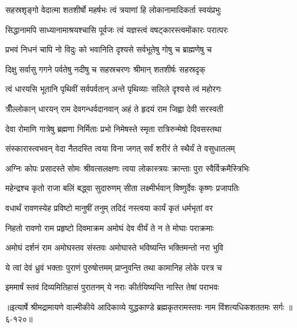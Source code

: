 \twolineshloka
{सहस्रशृङ्गो वेदात्मा शतशीर्षो महर्षभः}
{त्वं त्रयाणां हि लोकानामादिकर्ता स्वयंप्रभुः} %

\twolineshloka
{सिद्धानामपि साध्यानामाश्रयश्चासि पूर्वजः}
{त्वं यज्ञस्त्वं वषट्कारस्त्वमोंकारः परात्परः} %

\twolineshloka
{प्रभवं निधनं चापि नो विदुः को भवानिति}
{दृश्यसे सर्वभूतेषु गोषु च ब्राह्मणेषु च} %

\twolineshloka
{दिक्षु सर्वासु गगने पर्वतेषु नदीषु च}
{सहस्रचरणः श्रीमान् शतशीर्षः सहस्रदृक्} %

\twolineshloka
{त्वं धारयसि भूतानि पृथिवीं सर्वपर्वतान्}
{अन्ते पृथिव्याः सलिले दृश्यसे त्वं महोरगः} %

\twolineshloka
{त्रीँल्लोकान् धारयन् राम देवगन्धर्वदानवान्}
{अहं ते हृदयं राम जिह्वा देवी सरस्वती} %

\twolineshloka
{देवा रोमाणि गात्रेषु ब्रह्मणा निर्मिताः प्रभो}
{निमेषस्ते स्मृता रात्रिरुन्मेषो दिवसस्तथा} %

\twolineshloka
{संस्कारास्त्वभवन् वेदा नैतदस्ति त्वया विना}
{जगत् सर्वं शरीरं ते स्थैर्यं ते वसुधातलम्} %

\twolineshloka
{अग्निः कोपः प्रसादस्ते सोमः श्रीवत्सलक्षणः}
{त्वया लोकास्त्रयः क्रान्ताः पुरा स्वैर्विक्रमैस्त्रिभिः} %

\twolineshloka
{महेन्द्रश्च कृतो राजा बलिं बद्ध्वा सुदारुणम्}
{सीता लक्ष्मीर्भवान् विष्णुर्देवः कृष्णः प्रजापतिः} %

\twolineshloka
{वधार्थं रावणस्येह प्रविष्टो मानुषीं तनुम्}
{तदिदं नस्त्वया कार्यं कृतं धर्मभृतां वर} %

\twolineshloka
{निहतो रावणो राम प्रहृष्टो दिवमाक्रम}
{अमोघं देव वीर्यं ते न ते मोघाः पराक्रमाः} %

\twolineshloka
{अमोघं दर्शनं राम अमोघस्तव संस्तवः}
{अमोघास्ते भविष्यन्ति भक्तिमन्तो नरा भुवि} %

\twolineshloka
{ये त्वां देवं ध्रुवं भक्ताः पुराणं पुरुषोत्तमम्}
{प्राप्नुवन्ति तथा कामानिह लोके परत्र च} %

\twolineshloka
{इममार्षं स्तवं दिव्यमितिहासं पुरातनम्}
{ये नराः कीर्तयिष्यन्ति नास्ति तेषां पराभवः} %


॥इत्यार्षे श्रीमद्रामायणे वाल्मीकीये आदिकाव्ये युद्धकाण्डे ब्रह्मकृतरामस्तवः नाम विंशत्यधिकशततमः सर्गः ॥६-१२०॥
